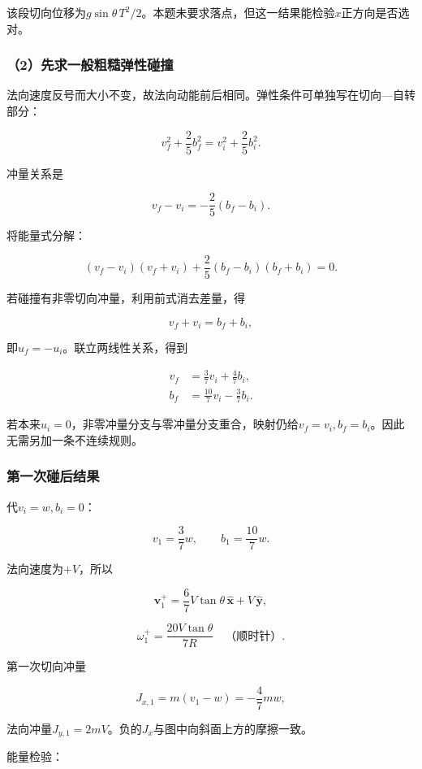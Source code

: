\documentclass[12pt,a4paper,fontset=fandol]{ctexart}
\begin{document}
该段切向位移为\(g\sin\theta\,T^2/2\)。本题未要求落点，但这一结果能检验\(x\)正方向是否选对。

\subsubsection{（2）先求一般粗糙弹性碰撞}\label{ux5148ux6c42ux4e00ux822cux7c97ux7cd9ux5f39ux6027ux78b0ux649e}

法向速度反号而大小不变，故法向动能前后相同。弹性条件可单独写在切向---自转部分：

\[
v_f^2+\frac25b_f^2
=v_i^2+\frac25b_i^2.
\]

冲量关系是

\[
v_f-v_i=-\frac25(b_f-b_i).
\]

将能量式分解：

\[
(v_f-v_i)(v_f+v_i)
+\frac25(b_f-b_i)(b_f+b_i)=0.
\]

若碰撞有非零切向冲量，利用前式消去差量，得

\[
v_f+v_i=b_f+b_i,
\]

即\(u_f=-u_i\)。联立两线性关系，得到

\[
\boxed{
\begin{aligned}
v_f&=\frac37v_i+\frac47b_i,\\
b_f&=\frac{10}{7}v_i-\frac37b_i.
\end{aligned}}
\]

若本来\(u_i=0\)，非零冲量分支与零冲量分支重合，映射仍给\(v_f=v_i,b_f=b_i\)。因此无需另加一条不连续规则。

\subsubsection{第一次碰后结果}\label{ux7b2cux4e00ux6b21ux78b0ux540eux7ed3ux679c}

代\(v_i=w,b_i=0\)：

\[
v_1=\frac37w,\qquad
b_1=\frac{10}{7}w.
\]

法向速度为\(+V\)，所以

\[
\boxed{
\boldsymbol v_1^+
=\frac67V\tan\theta\,\hat{\boldsymbol x}
+V\,\hat{\boldsymbol y}},
\]

\[
\boxed{\omega_1^+=\frac{20V\tan\theta}{7R}}
\quad\text{（顺时针）}.
\]

第一次切向冲量

\[
J_{x,1}=m(v_1-w)=-\frac47mw,
\]

法向冲量\(J_{y,1}=2mV\)。负的\(J_x\)与图中向斜面上方的摩擦一致。

能量检验：
\end{document}
